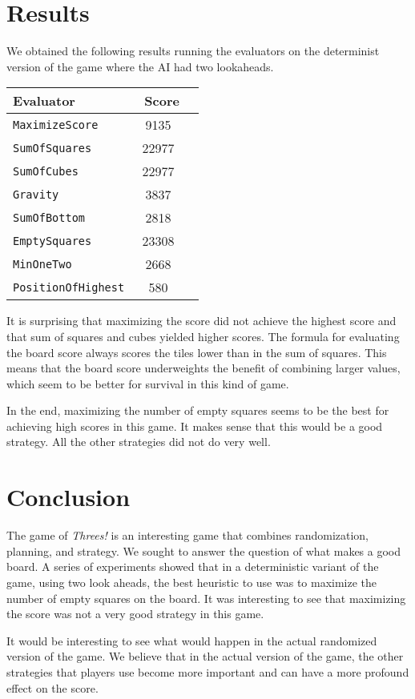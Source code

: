 \documentclass[11pt]{article}
\begin{document}
\section{Results}

We obtained the following results running the evaluators on the determinist version of the game where the AI had two lookaheads.

\begin{tabular}{l c c}
\hline\hline %
Evaluator & \ Score
\\ [0.5ex] 
\hline %
 
\texttt{MaximizeScore} & 9135 \\

\texttt{SumOfSquares} &  22977 \\

\texttt{SumOfCubes} &  22977  \\

\texttt{Gravity} & 3837   \\

\texttt{SumOfBottom} & 2818  \\

\texttt{EmptySquares} & 23308  \\

\texttt{MinOneTwo} & 2668\\

\texttt{PositionOfHighest} & 580  \\
 
\hline %
\end{tabular}

It is surprising that maximizing the score did not achieve the highest score and that sum of squares and cubes yielded higher scores. The formula for evaluating the board score always scores the tiles lower than in the sum of squares. This means that the board score underweights the benefit of combining larger values, which seem to be better for survival in this kind of game. 

In the end, maximizing the number of empty squares seems to be the best for achieving high scores in this game. It makes sense that this would be a good strategy. All the other strategies did not do very well. 

\section{Conclusion}

The game of \emph{Threes!} is an interesting game that combines randomization, planning, and strategy. We sought to answer the question of what makes a good board. A series of experiments showed that in a deterministic variant of the game, using two look aheads, the best heuristic to use was to maximize the number of empty squares on the board. It was interesting to see that maximizing the score was not a very good strategy in this game.

It would be interesting to see what would happen in the actual randomized version of the game. We believe that in the actual version of the game, the other strategies that players use become more important and can have a more profound effect on the score.
\end{document}
